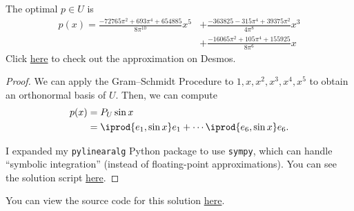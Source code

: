 \documentclass{amsart}
\newcommand{\pagenum}{202}
\newcommand{\probnum}{13}
\begin{document}
\begin{claim*}
The optimal $p\in U$ is
\begin{align*}
    p(x)=\frac{- 72765 \pi^{2} + 693 \pi^{4} + 654885}
    {8 \pi^{10}} x^{5}
    &+ \frac{-363825 - 315 \pi^{4} + 39375 \pi^{2}}
    {4 \pi^{8}} x^{3} \\
    &+ \frac{- 16065 \pi^{2}+ 105 \pi^{4} + 155925}{8 \pi^{6}} x
\end{align*}
Click \href{https://www.desmos.com/calculator/dldsdtkuav}{here}
to check out the approximation on Desmos.
\end{claim*}
\begin{proof}
We can apply
the Gram--Schmidt Procedure to $1,x,x^2,x^3,x^4,x^5$
to obtain an orthonormal basis of $U.$
Then, we can compute
\begin{align*}
    p(x) &= P_U\sin x \\
         &= \iprod{e_1,\sin x}e_1+\cdots\iprod{e_6,\sin x}e_6.
\end{align*}

I expanded my \texttt{pylinearalg} Python package to use \texttt{sympy},
which can handle ``symbolic integration'' (instead of floating-point
approximations). You can see the solution script
\href{https://github.com/thomasbreydo/pylinearalg/blob/main/examples/page202_prob13.py}{here}.
\end{proof}

\vspace{0.5in}

\begin{note*}
You can view the source code for this solution
\href{https://github.com/thomasbreydo/linalg/blob/main/\pagenum_\probnum_Thomas_Breydo.tex}
{here}.
\end{note*}
\end{document}
